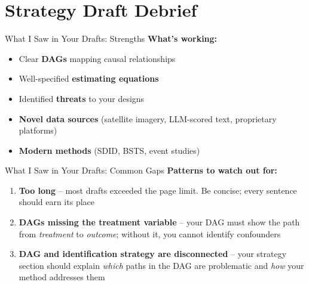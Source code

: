 
\section{Strategy Draft Debrief}

\begin{frame}{What I Saw in Your Drafts: Strengths}
  \textbf{\textcolor{usfgreen}{What's working:}}

  \vspace{6pt}

  \begin{itemize}
    \item Clear \textbf{DAGs} mapping causal relationships
    \item Well-specified \textbf{estimating equations}
    \item Identified \textbf{threats} to your designs
    \item \textbf{Novel data sources} (satellite imagery, LLM-scored text, proprietary platforms)
    \item \textbf{Modern methods} (SDID, BSTS, event studies)
  \end{itemize}
\end{frame}

\begin{frame}{What I Saw in Your Drafts: Common Gaps}
  \textbf{\textcolor{red!70}{Patterns to watch out for:}}

  \vspace{6pt}

  \begin{enumerate}
    \item \textbf{Too long} -- most drafts exceeded the page limit. Be concise; every sentence should earn its place
    \item \textbf{DAGs missing the treatment variable} -- your DAG must show the path from \textit{treatment} to \textit{outcome}; without it, you cannot identify confounders
    \item \textbf{DAG and identification strategy are disconnected} -- your strategy section should explain \textit{which} paths in the DAG are problematic and \textit{how} your method addresses them
  \end{enumerate}
\end{frame}

